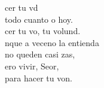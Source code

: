 \begin{cancion}%
	cer tu vd \\
	 todo cuanto o hoy.\\
	cer tu vo, tu volund.\\
\jump
	nque a veceno la entienda\\
	no queden casi zas,\\
	ero vivir, Seor,\\
	para hacer tu von.\\
\end{cancion}%
